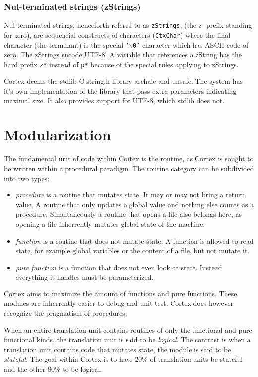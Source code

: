 \documentclass{report}
\begin{document}
\subsection{Nul-terminated strings (zStrings)}
Nul-terminated strings, henceforth refered to as \texttt{zStrings}, (the z- prefix standing for \emph{z}ero), are sequencial constructs of characters (\texttt{CtxChar}) where the final character (the terminant) is the special \texttt{'$\backslash$0'} character which has ASCII code of zero.
The zStrings encode UTF-8.
A variable that references a zString has the hard prefix \texttt{z*} instead of \texttt{p*} because of the special rules applying to zStrings.

Cortex deems the stdlib C string.h library archaic and unsafe.
The system has it's own implementation of the library that pass extra parameters indicating maximal size.
It also provides support for UTF-8, which stdlib does not.

\chapter{Modularization}
The fundamental unit of code within Cortex is the routine, as Cortex is sought to be written within a procedural paradigm.
The routine category can be subdivided into two types:
\begin{itemize}
    \item \emph{procedure} is a routine that mutates state. It may or may not bring a return value. 
    A routine that only updates a global value and nothing else counts as a procedure. 
    Simultaneously a routine that opens a file also belongs here, as opening a file inherrently mutates global state of the machine.
    \item \emph{function} is a routine that does not mutate state. A function is allowed to read state, for example global variables or the content of a file, but not mutate it.
    \item \emph{pure function} is a function that does not even look at state. Instead everything it handles must be parameterized.
\end{itemize}
Cortex aims to maximize the amount of functions and pure functions. 
These modules are inherrently easier to debug and unit test. 
Cortex does however recognize the pragmatism of procedures. 

When an entire translation unit contains routines of only the functional and pure functional kinds, the translation unit is said to be \emph{logical}.
The contrast is when a translation unit contains code that mutates state, the module is said to be \emph{stateful}.
The goal within Cortex is to have 20\% of translation units be stateful and the other 80\% to be logical.
\end{document}
